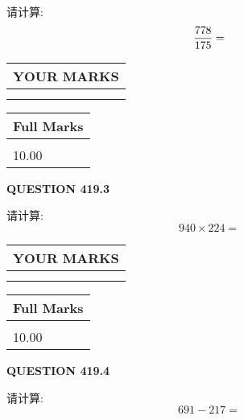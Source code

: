 \documentclass{ctexart}
\begin{document}
  
 
请计算:
\begin{equation}
\frac { %
778 }  {  %
175} = \nonumber
\end{equation}
 

 

 
  
\vspace{0.2in}
  
\noindent\begin{tabular}{|l|}
\hline
 YOUR MARKS  \\
\hline
 \\ 
 \\ 
\hline
\end{tabular}
\hspace{0.05in} \begin{tabular}{|l|}
\hline
 Full Marks  \\
\hline
 \\ 
10.00 \\
\hline
\end{tabular}
{\textbf{\Large{QUESTION
419.3 
}}}
  
  
 
请计算:
\begin{equation}
940  \times    %
224 = \nonumber
\end{equation}
 

 

 
  
\vspace{0.2in}
  
\noindent\begin{tabular}{|l|}
\hline
 YOUR MARKS  \\
\hline
 \\ 
 \\ 
\hline
\end{tabular}
\hspace{0.05in} \begin{tabular}{|l|}
\hline
 Full Marks  \\
\hline
 \\ 
10.00 \\
\hline
\end{tabular}
{\textbf{\Large{QUESTION
419.4 
}}}
  
  
 
请计算:
\begin{equation}
691 -   %
217 = \nonumber
\end{equation}
 

 
\end{document}
